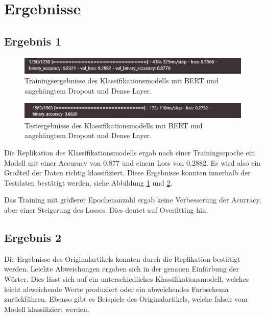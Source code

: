 \documentclass[DIV=13,fontsize=11pt]{scrartcl}
\begin{document}
\section{Ergebnisse}

\subsection{Ergebnis 1}

\begin{figure}[H]
    \centering
    \includegraphics[width=\linewidth]{img/train_time.png}
    \caption{Trainingsergebnisse des Klassifikationsmodells mit BERT und angehängtem Dropout und Dense Layer.}
    \label{fig:modell_train}
\end{figure}

\begin{figure}[H]
    \centering
    \includegraphics[width=\linewidth]{img/test_time.png}
    \caption{Testergebnisse des Klassifikationsmodells mit BERT und angehängtem Dropout und Dense Layer.}
    \label{fig:modell_test}
\end{figure}

Die Replikation des Klassifikationsmodells ergab nach einer Trainingsepoche ein Modell mit einer Accuracy von $0.877$ und
einem Loss von $0.2882$. Es wird also ein Großteil der Daten richtig klassifiziert. Diese Ergebnisse konnten innerhalb
der Testdaten bestätigt werden, siehe Abbildung \ref{fig:modell_train} und \ref{fig:modell_test}.

Das Training mit größerer Epochenanzahl ergab keine Verbesserung der Acurracy, aber einer Steigerung des Losses. Dies
deutet auf Overfitting hin.

\subsection{Ergebnis 2}

Die Ergebnisse des Originalartikels konnten durch die Replikation bestätigt werden. Leichte Abweichungen
ergaben sich in der genauen Einfärbung der Wörter. Dies lässt sich auf ein unterschiedliches Klassifikationsmodell,
welches leicht abweichende Werte produziert oder ein abweichendes Farbschema zurückführen.
Ebenso gibt es Beispiele des Originalartikels, welche falsch vom Modell klassifiziert werden.\\
\end{document}
